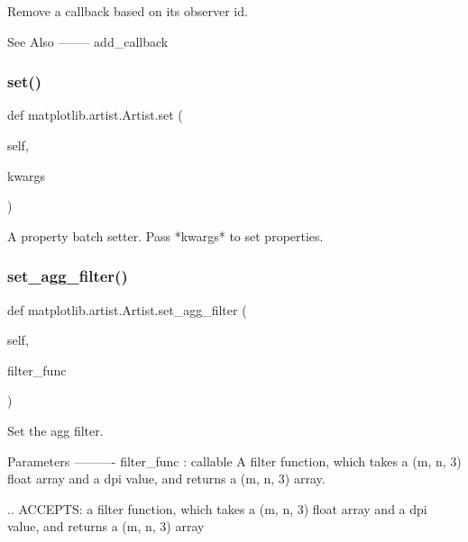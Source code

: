\begin{DoxyVerb}Remove a callback based on its observer id.

See Also
--------
add_callback
\end{DoxyVerb}
 \mbox{\label{classmatplotlib_1_1artist_1_1Artist_a45960d7e3f83ea6bd291d48116ca4d34}} 
\subsubsection{\texorpdfstring{set()}{set()}}
{\footnotesize\ttfamily def matplotlib.\+artist.\+Artist.\+set (\begin{DoxyParamCaption}\item[{}]{self,  }\item[{}]{kwargs }\end{DoxyParamCaption})}

\begin{DoxyVerb}A property batch setter.  Pass *kwargs* to set properties.\end{DoxyVerb}
 \mbox{\label{classmatplotlib_1_1artist_1_1Artist_a5cc2db96730cb274f965afd3f58d719e}} 
\subsubsection{\texorpdfstring{set\+\_\+agg\+\_\+filter()}{set\_agg\_filter()}}
{\footnotesize\ttfamily def matplotlib.\+artist.\+Artist.\+set\+\_\+agg\+\_\+filter (\begin{DoxyParamCaption}\item[{}]{self,  }\item[{}]{filter\+\_\+func }\end{DoxyParamCaption})}

\begin{DoxyVerb}Set the agg filter.

Parameters
----------
filter_func : callable
    A filter function, which takes a (m, n, 3) float array and a dpi
    value, and returns a (m, n, 3) array.

    .. ACCEPTS: a filter function, which takes a (m, n, 3) float array
and a dpi value, and returns a (m, n, 3) array
\end{DoxyVerb}
 \mbox{\label{classmatplotlib_1_1artist_1_1Artist_ac40011e4ebbc7ecf8816e94d04e5ebe1}} 
